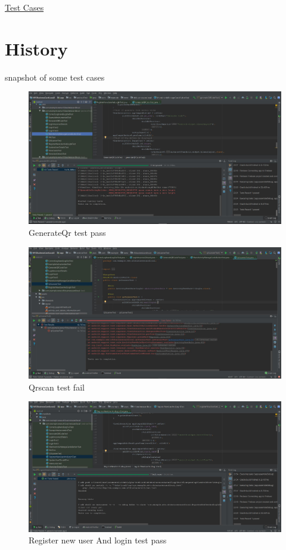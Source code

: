 \documentclass[english]{article}
\begin{document}
					\href{https://github.com/XoloKDandashe/Alpha-Tech/tree/master/Code/NFCBusinessCardLocal2/app/src/androidTest/java/com/example/www/nfcbusinesscardlocal}{Test Cases}
	\section{History}
	snapshot of some test cases
\begin{figure}[h!]
				\centering
			\includegraphics[scale=0.7]{Capture.jpg}
				\caption{GenerateQr test pass}
				\label{figure: 1}
			\end{figure}
\begin{figure}
				\centering
			\includegraphics[scale=0.7]{QrscanFail.jpg}
				\caption{Qrscan test fail}
				\label{figure: 1}
			\end{figure}
\begin{figure}
				\centering
			\includegraphics[scale=0.7]{RegisterTest.jpg}
				\caption{Register new user And login test pass}
				\label{figure: 1}
			\end{figure}
\end{document}
